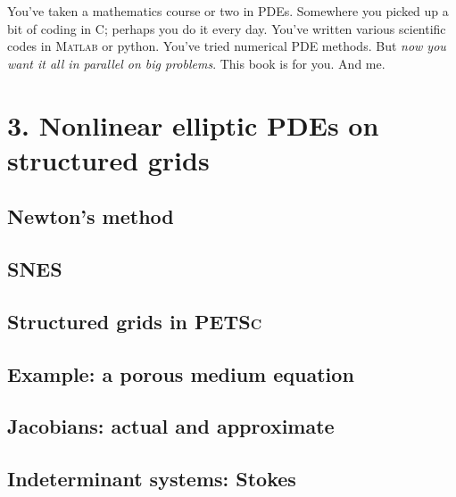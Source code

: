 \documentclass{tufte-book}
\newcommand*\FancyVerbStartString{fill string}
\newcommand*\FancyVerbStopString{fill string}
\newcommand{\cinputraw}[6]{
\renewcommand*\FancyVerbStartString{#5}
\renewcommand*\FancyVerbStopString{#6}
\begin{figure*}
\vspace{0.8cm}
\VerbatimInput[frame=single,%
               framesep=3mm,%
               label=\fbox{\normalsize \textsl{\,#2\,}#4},%
               fontfamily=courier,%
               fontsize=\small]{#1}
\vspace{0.5cm}
\caption{#3}
\end{figure*}
}
\newcommand{\cinput}[4]{%
    \cinputraw{cstrip/#1}{#1}{#2}{}{#3}{#4}}
\newcommand{\Matlab}{\textsc{Matlab}\xspace}
\newcommand{\PETSc}{\textsc{PETSc}\xspace}
\begin{document}
You've taken a mathematics course or two in PDEs.  Somewhere you picked up a bit of coding in C; perhaps you do it every day.  You've written various scientific codes in \Matlab or python.  You've tried numerical PDE methods.  But \emph{now you want it all in parallel on big problems}.  This book is for you.  And me.


\mainmatter






\chapter{3. Nonlinear elliptic PDEs on structured grids}

\section{Newton's method}

\section{\textsc{SNES}}


\section{Structured grids in \PETSc}


\section{Example: a porous medium equation}


\section{Jacobians: actual and approximate}

\section{Indeterminant systems: Stokes}

\end{document}
